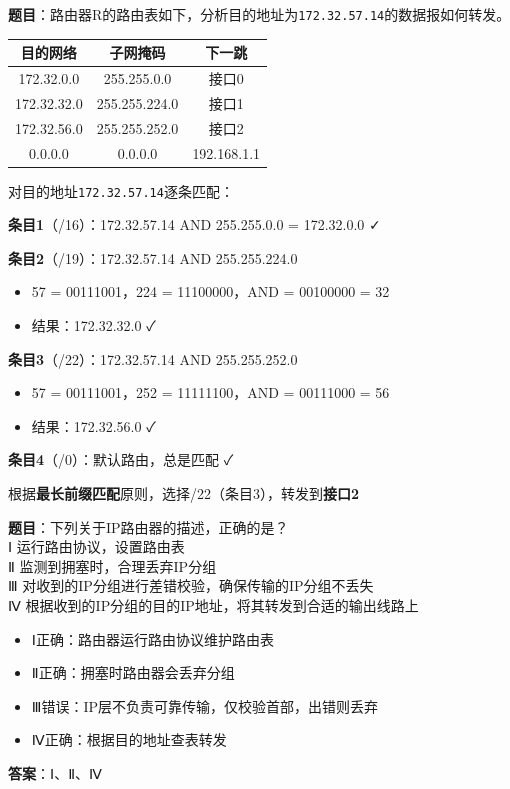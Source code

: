 \begin{examplebox}[例题4.9 路由表查找]
\textbf{题目}：路由器R的路由表如下，分析目的地址为\texttt{172.32.57.14}的数据报如何转发。

\begin{center}\small
\begin{tabular}{|c|c|c|}
\hline
目的网络 & 子网掩码 & 下一跳 \\
\hline
172.32.0.0 & 255.255.0.0 & 接口0 \\
172.32.32.0 & 255.255.224.0 & 接口1 \\
172.32.56.0 & 255.255.252.0 & 接口2 \\
0.0.0.0 & 0.0.0.0 & 192.168.1.1 \\
\hline
\end{tabular}
\end{center}
\tcblower
对目的地址\texttt{172.32.57.14}逐条匹配：

\textbf{条目1}（/16）：172.32.57.14 AND 255.255.0.0 = 172.32.0.0 ✓

\textbf{条目2}（/19）：172.32.57.14 AND 255.255.224.0
\begin{itemize}[itemsep=0pt]
    \item 57 = 00111001，224 = 11100000，AND = 00100000 = 32
    \item 结果：172.32.32.0 ✓
\end{itemize}

\textbf{条目3}（/22）：172.32.57.14 AND 255.255.252.0
\begin{itemize}[itemsep=0pt]
    \item 57 = 00111001，252 = 11111100，AND = 00111000 = 56
    \item 结果：172.32.56.0 ✓
\end{itemize}

\textbf{条目4}（/0）：默认路由，总是匹配 ✓

根据\textbf{最长前缀匹配}原则，选择/22（条目3），转发到\textbf{接口2}
\end{examplebox}

\begin{examplebox}[例题4.10 IP路由器功能]
\textbf{题目}：下列关于IP路由器的描述，正确的是？\\
Ⅰ 运行路由协议，设置路由表\\
Ⅱ 监测到拥塞时，合理丢弃IP分组\\
Ⅲ 对收到的IP分组进行差错校验，确保传输的IP分组不丢失\\
Ⅳ 根据收到的IP分组的目的IP地址，将其转发到合适的输出线路上
\tcblower
\begin{itemize}[itemsep=0pt]
    \item Ⅰ正确：路由器运行路由协议维护路由表
    \item Ⅱ正确：拥塞时路由器会丢弃分组
    \item Ⅲ错误：IP层不负责可靠传输，仅校验首部，出错则丢弃
    \item Ⅳ正确：根据目的地址查表转发
\end{itemize}

\textbf{答案}：Ⅰ、Ⅱ、Ⅳ
\end{examplebox}
